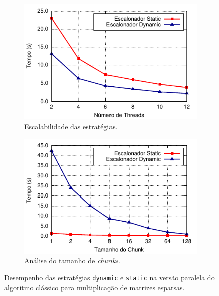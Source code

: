 \documentclass{SBCbookchapter}
\begin{document}
		\begin{figure}[b]
			\captionsetup[subfigure]{justification=centering}
			\centering
				\begin{subfigure}{0.40\linewidth}
					\includegraphics[width=\linewidth]{img/smm}
					\caption{Escalabilidade das estratégias.}
					\label{fig:static-dynamic-guided}
				\end{subfigure}
				\quad
				\begin{subfigure}{0.40\linewidth}
					\includegraphics[width=\linewidth]{img/chunk-size}
					\caption{Análise do tamanho de \textit{chunks}.}
					\label{fig:chunk-size}
				\end{subfigure}
			\caption{Desempenho das estratégias \texttt{dynamic} e
			\texttt{static} na versão paralela do algoritmo clássico para multiplicação de matrizes esparsas.}
		\end{figure}
\end{document}
